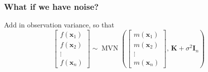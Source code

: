 \documentclass{beamer}
\DeclareMathOperator{\MVN}{MVN}
\begin{document}
\begin{frame}
\end{frame}

\begin{frame}
    \frametitle{What if we have noise?}
    Add in observation variance, so that $$\begin{bmatrix}
            f(\mathbf{x}_1) \\ f(\mathbf{x}_2)\\ \vdots\\ f(\mathbf{x}_n)
        \end{bmatrix} \sim
        \MVN\left(\begin{bmatrix}
            m(\mathbf{x}_1) \\ m(\mathbf{x}_2)\\ \vdots\\ m(\mathbf{x}_n)
        \end{bmatrix},\, \mathbf{K} + \sigma^2\mathbf{I}_n\right)$$
\end{frame}
\end{document}
